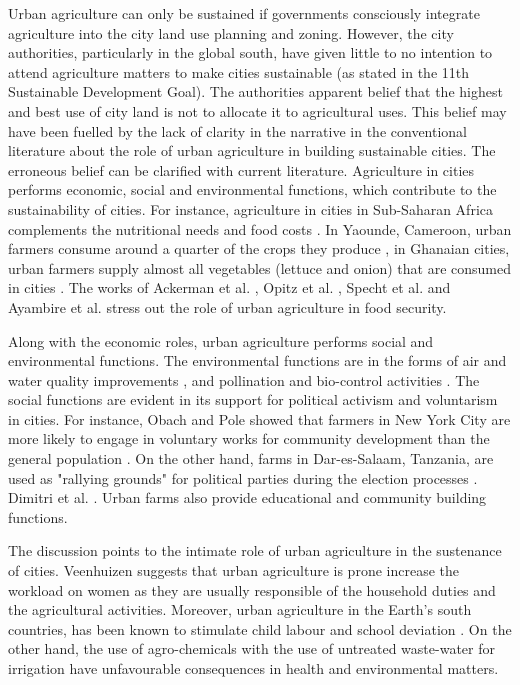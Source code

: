 Urban agriculture can only be sustained if governments consciously integrate agriculture into the city land use planning and zoning. However, the city authorities, particularly in the global south, have given little to no intention to attend agriculture matters to make cities sustainable (as stated in the 11th Sustainable Development Goal). The authorities apparent belief that the highest and best use of city land is not to allocate it to agricultural uses. This belief may have been fuelled by the lack of clarity in the narrative in the conventional literature about the role of urban agriculture in building sustainable cities. The erroneous belief can be clarified with current literature. Agriculture in cities performs economic, social and environmental functions, which contribute to the sustainability of cities. For instance, agriculture in cities in Sub-Saharan Africa complements the nutritional needs and food costs \cite{Binns2013}. In Yaounde, Cameroon, urban farmers consume around a quarter of the crops they produce \cite{Prain2010}, in Ghanaian cities, urban farmers supply almost all vegetables (lettuce and onion) that are consumed in cities \cite{Kodjo2014, Drechsel2014}. The works of Ackerman et al. \cite{Ackerman2014}, Opitz et al. \cite{Opitz2016}, Specht et al. \cite{Specht2014} and Ayambire et al. \cite{Ayambire2019} stress out the role of urban agriculture in food security.

Along with the economic roles, urban agriculture performs social and environmental functions. The environmental functions are in the forms of air and water quality improvements \cite{Lin2015}, and pollination and bio-control activities \cite{Lin2015, Camps-Calvet2016}. The social functions are evident in its support for political activism and voluntarism in cities. For instance, Obach and Pole showed that farmers in New York City are more likely to engage in voluntary works for community development than the general population \cite{Obach2014, Pole2013}. On the other hand, farms in Dar-es-Salaam, Tanzania, are used as "rallying grounds" for political parties during the election processes \cite{McLees}. Dimitri et al. \cite{Dimitri2016}. Urban farms also provide educational and community building functions.

The discussion points to the intimate role of urban agriculture in the sustenance of cities. Veenhuizen \cite{Veenhuizen} suggests that urban agriculture is prone increase the workload on women as they are usually responsible of the household duties and the agricultural activities. Moreover, urban agriculture in the Earth's south countries, has been known to stimulate child labour and school deviation \cite{Edet2013, InternationalLabourOrganization2006}. On the other hand, the use of agro-chemicals \cite{Amoah2007, Agbenyour2014} with the use of untreated waste-water for irrigation \cite{Amponsah2015, Amponsah2016, Becerra-Castro2015, Mara2010, Ndunda2013} have unfavourable consequences in health and environmental matters.

